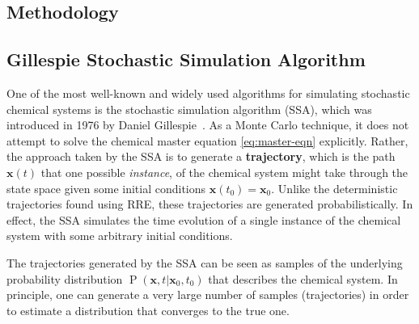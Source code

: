 \documentclass[english,letterpaper,12pt]{report}
\newcommand{\defkeywd}[1]{\textbf{#1}}
\renewcommand{\vec}[1]{\ensuremath{\mathbf{#1}}}
\DeclareMathOperator{\Prob}{P}
\begin{document}
\begin{doublespacing}


\chapter{Methodology} %
\label{sec:methodology}

\section{Gillespie Stochastic Simulation Algorithm} %
\label{sub:gillespie-ssa}

One of the most well-known and widely used  algorithms for simulating stochastic chemical systems is the stochastic simulation algorithm (SSA), which was introduced in 1976 by Daniel Gillespie~\cite{gillespie-1976}. As a Monte Carlo technique, it does not attempt to solve the chemical master equation \eqref{eq:master-eqn} explicitly. Rather, the approach taken by the SSA is to generate a \defkeywd{trajectory}, which is the path $\vec{x}(t)$ that one possible \emph{instance}, of the chemical system might take through the state space given some initial conditions $\vec{x}(t_0) = \vec{x}_0$. Unlike the deterministic trajectories found using RRE, these trajectories are generated probabilistically. In effect, the SSA simulates the time evolution of a single instance of the chemical system with some arbitrary initial conditions.

The trajectories generated by the SSA can be seen as samples of the underlying probability distribution $\Prob(\vec{x}, t | \vec{x}_0, t_0)$ that describes the chemical system. In principle, one can generate a very large number of samples (trajectories) in order to estimate a distribution that converges to the true one.



\end{doublespacing}
\end{document}

